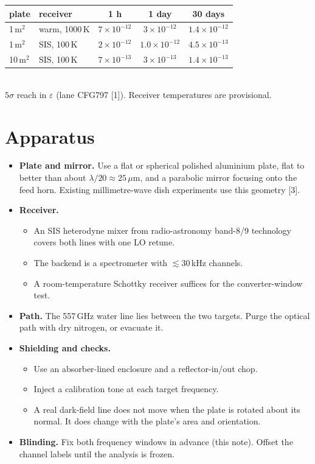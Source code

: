 \documentclass[10pt]{article}
\begin{document}
\begin{center}
\begin{tabular}{llccc}
\toprule
plate & receiver & 1 h & 1 day & 30 days\\
\midrule
1\,m$^2$ & warm, 1000\,K & $7\times10^{-12}$ & $3\times10^{-12}$ & $1.4\times10^{-12}$\\
1\,m$^2$ & SIS, 100\,K & $2\times10^{-12}$ & $1.0\times10^{-12}$ & $4.5\times10^{-13}$\\
10\,m$^2$ & SIS, 100\,K & $7\times10^{-13}$ & $3\times10^{-13}$ & $1.4\times10^{-13}$\\
\bottomrule
\end{tabular}\\[2pt]
{\footnotesize $5\sigma$ reach in $\varepsilon$ (lane CFG797 [1]). Receiver temperatures are provisional.}
\end{center}

\section{Apparatus}
\begin{itemize}
\item \textbf{Plate and mirror.} Use a flat or spherical polished aluminium plate, flat to better than about $\lambda/20\approx25\,\mu$m, and a parabolic mirror focusing onto the feed horn. Existing millimetre-wave dish experiments use this geometry [3].
\item \textbf{Receiver.}
  \begin{itemize}
  \item An SIS heterodyne mixer from radio-astronomy band-8/9 technology covers both lines with one LO retune.
  \item The backend is a spectrometer with $\lesssim30$\,kHz channels.
  \item A room-temperature Schottky receiver suffices for the converter-window test.
  \end{itemize}
\item \textbf{Path.} The 557\,GHz water line lies between the two targets. Purge the optical path with dry nitrogen, or evacuate it.
\item \textbf{Shielding and checks.}
  \begin{itemize}
  \item Use an absorber-lined enclosure and a reflector-in/out chop.
  \item Inject a calibration tone at each target frequency.
  \item A real dark-field line does not move when the plate is rotated about its normal. It does change with the plate's area and orientation.
  \end{itemize}
\item \textbf{Blinding.} Fix both frequency windows in advance (this note). Offset the channel labels until the analysis is frozen.
\end{itemize}
\end{document}
